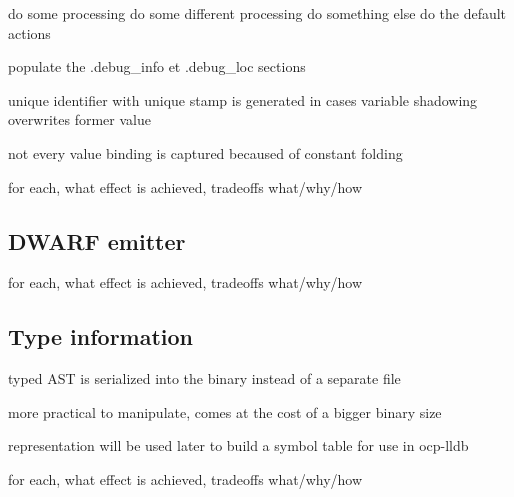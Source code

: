 

\begin{algorithmic}[1]
    \State do some processing
    \State do some different processing
    \State do something else
    \Else
    \State do the default actions
    \EndIf
\end{algorithmic}

populate the  .debug\_info et .debug\_loc sections

unique identifier with unique stamp is generated in cases variable shadowing overwrites former value

not every value binding is captured becaused of constant folding


for each, what effect is achieved, tradeoffs
what/why/how

\subsection{DWARF emitter}

for each, what effect is achieved, tradeoffs
what/why/how

\subsection{Type information}


typed AST is serialized into the binary instead of a separate file

more practical to manipulate, comes at the cost of a bigger binary size

representation will be used later to build a symbol table for use in ocp-lldb


for each, what effect is achieved, tradeoffs
what/why/how


